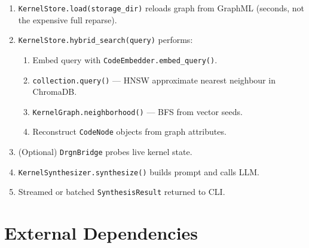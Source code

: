 \documentclass[11pt,a4paper]{article}
\newcommand{\coderef}[1]{\texttt{\small\color{layer2}#1}}
\begin{document}
\begin{enumerate}[leftmargin=2em, itemsep=3pt]
  \item \coderef{KernelStore.load(storage\_dir)} reloads graph from GraphML
        (seconds, not the expensive full reparse).
  \item \coderef{KernelStore.hybrid\_search(query)} performs:
        \begin{enumerate}[leftmargin=1.5em, itemsep=1pt]
          \item Embed query with \coderef{CodeEmbedder.embed\_query()}.
          \item \texttt{collection.query()} --- HNSW approximate nearest
                neighbour in ChromaDB.
          \item \coderef{KernelGraph.neighborhood()} --- BFS from vector seeds.
          \item Reconstruct \coderef{CodeNode} objects from graph attributes.
        \end{enumerate}
  \item (Optional) \coderef{DrgnBridge} probes live kernel state.
  \item \coderef{KernelSynthesizer.synthesize()} builds prompt and calls LLM.
  \item Streamed or batched \coderef{SynthesisResult} returned to CLI.
\end{enumerate}

\section{External Dependencies}
\label{sec:deps}
\end{document}
